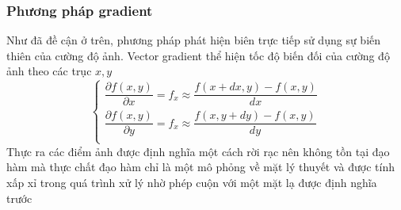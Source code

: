 \documentclass[14pt,oneside,a4paper]{extreport}
\begin{document}
\subsubsection{Phương pháp gradient}
Như đã đề cận ở trên, phương pháp phát hiện biên trực tiếp sử dụng sự biến thiên của cường độ ảnh. Vector gradient thể hiện tốc độ biến đối của cường độ ảnh theo các trục $x,y$ 
\begin{equation*}
\begin{cases}
 \dfrac{\partial f(x,y)}{\partial x}=f_x\approx\dfrac{f(x+dx,y)-f(x,y)}{dx}\\
 \dfrac{\partial f(x,y)}{\partial y}=f_x\approx\dfrac{f(x,y+dy)-f(x,y)}{dy}\\
   \end{cases}
\end{equation*}
Thực ra các điểm ảnh được định nghĩa một cách rời rạc nên không tồn tại đạo hàm mà thực chất đạo hàm chỉ là một mô phỏng về mặt lý thuyết và được tính xấp xỉ trong quá trình xử lý nhờ phép cuộn với một mặt lạ được định nghĩa trước
\end{document}
